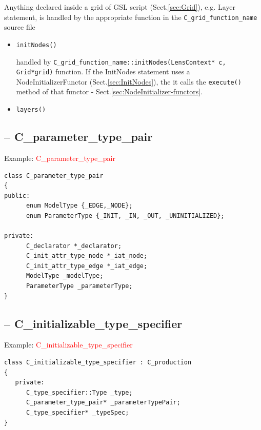 
Anything declared inside a grid  of GSL script (Sect.\ref{sec:Grid}), e.g. Layer
statement, is handled by the appropriate function in
the \verb!C_grid_function_name! source file

\begin{itemize}
    \item \verb!initNodes()!
    
handled by \verb!C_grid_function_name::initNodes(LensContext* c, Grid*grid)!
function. If the InitNodes statement uses a NodeInitializerFunctor
(Sect.\ref{sec:InitNodes}), the it calls the \verb!execute()! method of that
functor - Sect.\ref{sec:NodeInitializer-functors}.
    
    
    \item \verb!layers()!

\label{sec:C_grid_function_name::layers}
  \end{itemize}
  

\subsection{-- C\_parameter\_type\_pair}
\label{sec:C_parameter_type_pair}
Example: \textcolor{red}{C\_parameter\_type\_pair}
\begin{verbatim}
class C_parameter_type_pair
{
public:
      enum ModelType {_EDGE,_NODE};
      enum ParameterType {_INIT, _IN, _OUT, _UNINITIALIZED};

private:
      C_declarator *_declarator;
      C_init_attr_type_node *_iat_node;
      C_init_attr_type_edge *_iat_edge;
      ModelType _modelType;
      ParameterType _parameterType;
}
\end{verbatim}

\subsection{-- C\_initializable\_type\_specifier}
\label{sec:C_initializable_type_specifier}
Example: \textcolor{red}{C\_initializable\_type\_specifier}
\begin{verbatim}
class C_initializable_type_specifier : C_production
{
   private:
      C_type_specifier::Type _type;
      C_parameter_type_pair* _parameterTypePair;
      C_type_specifier* _typeSpec;
}
\end{verbatim}

